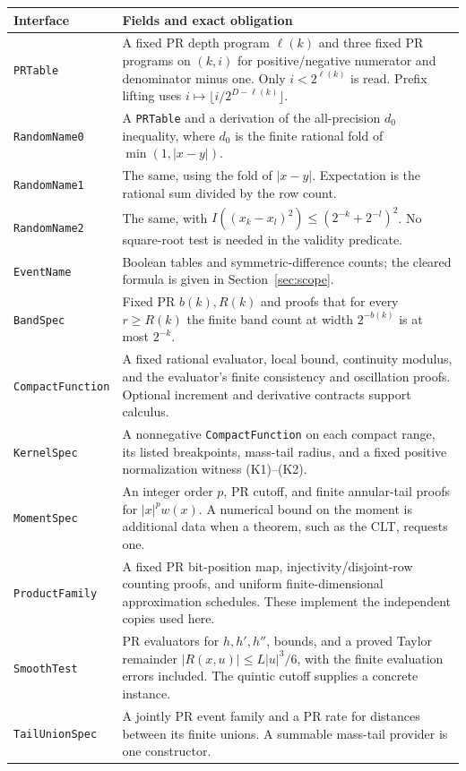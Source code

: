 \begin{longtable}{>{\raggedright\arraybackslash}p{}>{\raggedright\arraybackslash}p{}}
\toprule
Interface & Fields and exact obligation\\
\midrule\endhead
\texttt{PRTable} & A fixed PR depth program $\ell(k)$ and three fixed PR
programs on $(k,i)$ for positive/negative numerator and denominator minus
one. Only $i<2^{\ell(k)}$ is read. Prefix lifting uses
$i\mapsto\lfloor i/2^{D-\ell(k)}\rfloor$.\\
\texttt{RandomName0} & A \texttt{PRTable} and a derivation of the all-precision
$d_0$ inequality, where $d_0$ is the finite rational fold of
$\min(1,|x-y|)$.\\
\texttt{RandomName1} & The same, using the fold of $|x-y|$. Expectation is
the rational sum divided by the row count.\\
\texttt{RandomName2} & The same, with
$I((x_k-x_l)^2)\le(2^{-k}+2^{-l})^2$. No square-root test is needed
in the validity predicate.\\
\texttt{EventName} & Boolean tables and symmetric-difference counts;
the cleared formula is given in Section~\ref{sec:scope}.\\
\texttt{BandSpec} & Fixed PR $b(k),R(k)$ and proofs that for every
$r\ge R(k)$ the finite band count at width $2^{-b(k)}$ is at most $2^{-k}$.\\
\texttt{CompactFunction} & A fixed rational evaluator, local bound, continuity
modulus, and the evaluator's finite consistency and oscillation proofs.
Optional increment and derivative contracts support calculus.\\
\texttt{KernelSpec} & A nonnegative \texttt{CompactFunction} on each compact
range, its listed breakpoints, mass-tail radius, and a fixed positive
normalization witness (K1)--(K2).\\
\texttt{MomentSpec} & An integer order $p$, PR cutoff, and finite annular-tail
proofs for $|x|^p w(x)$. A numerical bound on the moment is additional data
when a theorem, such as the CLT, requests one.\\
\texttt{ProductFamily} & A fixed PR bit-position map, injectivity/disjoint-row
counting proofs, and uniform finite-dimensional approximation schedules.
These implement the independent copies used here.\\
\texttt{SmoothTest} & PR evaluators for $h,h',h''$, bounds, and a proved
Taylor remainder $|R(x,u)|\le L|u|^3/6$, with the finite evaluation errors
included. The quintic cutoff supplies a concrete instance.\\
\texttt{TailUnionSpec} & A jointly PR event family and a PR rate for distances
between its finite unions. A summable mass-tail provider is one constructor.\\
\bottomrule
\end{longtable}

